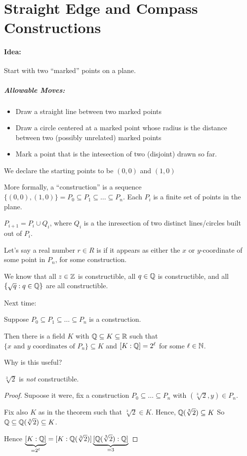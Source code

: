 \documentclass[notes.tex]{subfiles}
\begin{document}
\section*{Straight Edge and Compass Constructions}

\paragraph{Idea:}Start with two ``marked'' points on a plane. 
\subparagraph{Allowable Moves:} \leavevmode
	\begin{itemize}
		\item Draw a straight line between two marked points
		\item Draw a circle centered at a marked point whose radius is the distance between two (possibly unrelated) marked points
		\item Mark a point that is the intesection of two (disjoint) drawn so far.
	\end{itemize}

We declare the starting points to be $(0, 0)$ and $(1, 0)$


More formally, a ``construction'' is a sequence $\{(0, 0), (1, 0)\} = P_0\subseteq P_1\subseteq \ldots \subseteq P_n$. Each $P_i$ is a finite set of points in the plane.

$P_{i+1} = P_i \cup Q_i$, where $Q_i$ is a the inresection of two distinct lines/circles built out of $P_i$.

Let's say a real number $r\in R$ is  if it appears as either the $x$ or $y$-coordinate of some point in $P_n$, for some construction.

We know that all $z\in\mathbb{Z}$ is constructible, all $q\in\mathbb{Q}$ is constructible, and all
$\{\sqrt{q} : q\in \mathbb{Q}\}$ are all constructible.

Next time: 

\begin{theorem}
	\label{thm:non-constructible}
	Suppose $P_0\subseteq P_1\subseteq \ldots\subseteq P_n$ is a construction.

	Then there is a field $K$ with $\mathbb{Q}\subseteq K\subseteq \mathbb{R}$ such that
	$\{x\text{ and }y\text{ coordinates of } P_n\}\subseteq K$ and $[K:\mathbb{Q}]= 2^\ell$ for some $\ell\in\mathbb{N}$.
\end{theorem}

Why is this useful?
\begin{proposition}
	$\sqrt[3]{2}$ is \emph{not} constructible.
\end{proposition}
\begin{proof}
	Supoose it were, fix a construction $P_0 \subseteq \ldots\subseteq P_n$ with $(\sqrt[3]{2}, y)\in P_n$.

	Fix also $K$ as in the theorem such that $\sqrt[3]{2}\in K$. Hence, $\mathbb{Q}(\sqrt[3]{2})\subseteq K$
	So $\mathbb{Q}\subseteq \mathbb{Q}(\sqrt[3]{2})\subseteq K$.

	Hence $\underbrace{[K:\mathbb{Q}]}_{=2^\ell} = [K:\mathbb{Q}(\sqrt[3]{2})]\underbrace{[\mathbb{Q}(\sqrt[3]{2}) : \mathbb{Q}]}_{=3}$
\end{proof}
\end{document}
